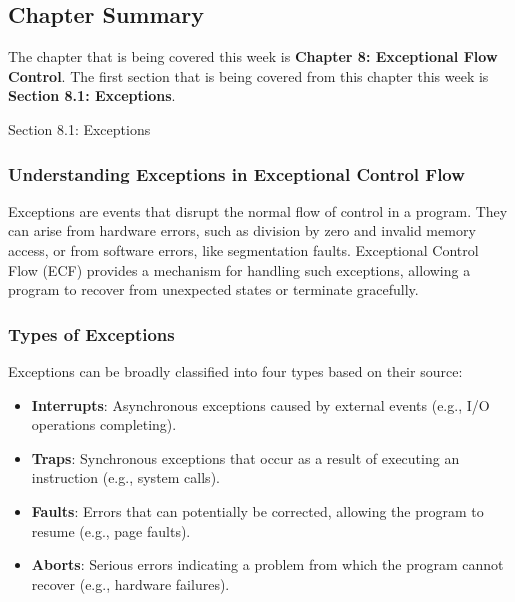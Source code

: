 \newpage

\subsection{Chapter Summary}

The chapter that is being covered this week is \textbf{Chapter 8: Exceptional Flow Control}. The first section that is being covered from this chapter this week is \textbf{Section 8.1: Exceptions}.

\begin{notes}{Section 8.1: Exceptions}
    \subsubsection*{Understanding Exceptions in Exceptional Control Flow}

    Exceptions are events that disrupt the normal flow of control in a program. They can arise from hardware errors, such as division by zero and invalid memory access, or from software errors, like 
    segmentation faults. Exceptional Control Flow (ECF) provides a mechanism for handling such exceptions, allowing a program to recover from unexpected states or terminate gracefully. \vspace*{1em}
    
    \subsubsection*{Types of Exceptions}
    
    Exceptions can be broadly classified into four types based on their source:
    
    \begin{itemize}
        \item \textbf{Interrupts}: Asynchronous exceptions caused by external events (e.g., I/O operations completing).
        \item \textbf{Traps}: Synchronous exceptions that occur as a result of executing an instruction (e.g., system calls).
        \item \textbf{Faults}: Errors that can potentially be corrected, allowing the program to resume (e.g., page faults).
        \item \textbf{Aborts}: Serious errors indicating a problem from which the program cannot recover (e.g., hardware failures).
    \end{itemize}
    
    \vspace*{1em}
    

\end{notes}

